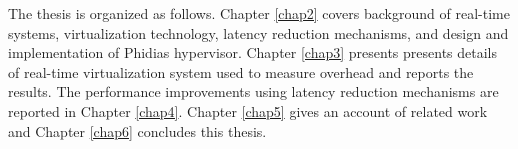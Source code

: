 The thesis is organized as follows. 
Chapter \ref{chap2} covers background of real-time systems, virtualization technology, latency reduction mechanisms, and 
design and implementation of Phidias hypervisor.
Chapter \ref{chap3} presents presents details of real-time virtualization system used to measure overhead and reports the results.
The performance improvements using latency reduction mechanisms are reported in Chapter \ref{chap4}.
Chapter \ref{chap5} gives an account of related work and Chapter \ref{chap6} concludes this thesis.


